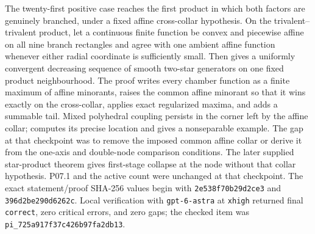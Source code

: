 The twenty-first positive case reaches the first product in which both
factors are genuinely branched, under a fixed affine cross-collar
hypothesis.  On the trivalent--trivalent product, let a continuous finite
function be convex and piecewise affine on all nine branch rectangles and
agree with one ambient affine function whenever either radial coordinate is
sufficiently small.  Then
 gives a uniformly
convergent decreasing sequence of smooth two-star generators on one fixed
product neighbourhood.  The proof writes every chamber function as a
finite maximum of affine minorants, raises the common affine minorant so
that it wins exactly on the cross-collar, applies exact regularized maxima,
and adds a summable tail.  Mixed polyhedral coupling persists in the
corner left by the affine collar;
 computes its precise location
and gives a nonseparable example.  The gap at that checkpoint was to remove the imposed common affine
collar or derive it from the one-axis and double-node comparison
conditions.  The later supplied star-product theorem gives first-stage
collapse at the node without that collar hypothesis.  P07.1 and the active count were
unchanged at that checkpoint.  The exact statement/proof SHA-256 values begin with
\texttt{2e538f70b29d2ce3} and \texttt{396d2be290d6262c}.  Local
verification with \texttt{gpt-6-astra} at \texttt{xhigh} returned final
\texttt{correct}, zero critical errors, and zero gaps; the checked item was
\nolinkurl{pi_725a917f37c426b97fa2db13}.

